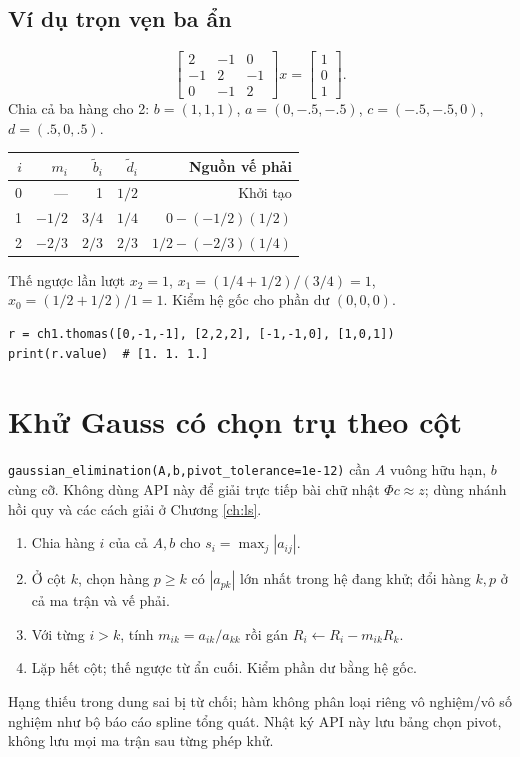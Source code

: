 \subsection{Ví dụ trọn vẹn ba ẩn}
\[
 \begin{bmatrix}2&-1&0\\-1&2&-1\\0&-1&2\end{bmatrix}x
 =\begin{bmatrix}1\\0\\1\end{bmatrix}.
\]
Chia cả ba hàng cho 2: $b=(1,1,1)$, $a=(0,-.5,-.5)$, $c=(-.5,-.5,0)$, $d=(.5,0,.5)$.
\begin{center}\begin{tabular}{rrrrr}\toprule
$i$&$m_i$&$\widetilde b_i$&$\widetilde d_i$&Nguồn vế phải\\\midrule
0&---&1&$1/2$&Khởi tạo\\
1&$-1/2$&$3/4$&$1/4$&$0-(-1/2)(1/2)$\\
2&$-2/3$&$2/3$&$2/3$&$1/2-(-2/3)(1/4)$\\\bottomrule
\end{tabular}\end{center}
Thế ngược lần lượt $x_2=1$, $x_1=(1/4+1/2)/(3/4)=1$, $x_0=(1/2+1/2)/1=1$. Kiểm hệ gốc cho phần dư $(0,0,0)$.
\begin{verbatim}
r = ch1.thomas([0,-1,-1], [2,2,2], [-1,-1,0], [1,0,1])
print(r.value)  # [1. 1. 1.]
\end{verbatim}

\section{Khử Gauss có chọn trụ theo cột}
\texttt{gaussian\_elimination(A,b,pivot\_tolerance=1e-12)} cần $A$ vuông hữu hạn, $b$ cùng cỡ. Không dùng API này để giải trực tiếp bài chữ nhật $\Phi c\approx z$; dùng nhánh hồi quy và các cách giải ở Chương \ref{ch:ls}.
\begin{enumerate}
\item Chia hàng $i$ của cả $A,b$ cho $s_i=\max_j|a_{ij}|$.
\item Ở cột $k$, chọn hàng $p\ge k$ có $|a_{pk}|$ lớn nhất trong hệ đang khử; đổi hàng $k,p$ ở cả ma trận và vế phải.
\item Với từng $i>k$, tính $m_{ik}=a_{ik}/a_{kk}$ rồi gán $R_i\leftarrow R_i-m_{ik}R_k$.
\item Lặp hết cột; thế ngược từ ẩn cuối. Kiểm phần dư bằng hệ gốc.
\end{enumerate}
Hạng thiếu trong dung sai bị từ chối; hàm không phân loại riêng vô nghiệm/vô số nghiệm như bộ báo cáo spline tổng quát. Nhật ký API này lưu bảng chọn pivot, không lưu mọi ma trận sau từng phép khử.

